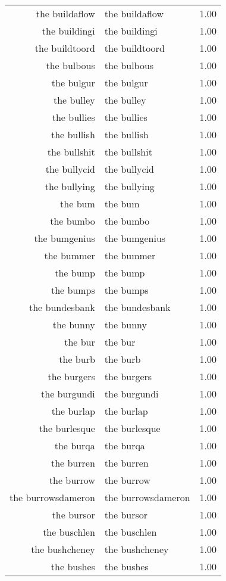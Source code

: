 \begin{table}[ht]
\begin{tabular}{rlr}
  the buildaflow & the buildaflow & 1.00 \\ 
  the buildingi & the buildingi & 1.00 \\ 
  the buildtoord & the buildtoord & 1.00 \\ 
  the bulbous & the bulbous & 1.00 \\ 
  the bulgur & the bulgur & 1.00 \\ 
  the bulley & the bulley & 1.00 \\ 
  the bullies & the bullies & 1.00 \\ 
  the bullish & the bullish & 1.00 \\ 
  the bullshit & the bullshit & 1.00 \\ 
  the bullycid & the bullycid & 1.00 \\ 
  the bullying & the bullying & 1.00 \\ 
  the bum & the bum & 1.00 \\ 
  the bumbo & the bumbo & 1.00 \\ 
  the bumgenius & the bumgenius & 1.00 \\ 
  the bummer & the bummer & 1.00 \\ 
  the bump & the bump & 1.00 \\ 
  the bumps & the bumps & 1.00 \\ 
  the bundesbank & the bundesbank & 1.00 \\ 
  the bunny & the bunny & 1.00 \\ 
  the bur & the bur & 1.00 \\ 
  the burb & the burb & 1.00 \\ 
  the burgers & the burgers & 1.00 \\ 
  the burgundi & the burgundi & 1.00 \\ 
  the burlap & the burlap & 1.00 \\ 
  the burlesque & the burlesque & 1.00 \\ 
  the burqa & the burqa & 1.00 \\ 
  the burren & the burren & 1.00 \\ 
  the burrow & the burrow & 1.00 \\ 
  the burrowsdameron & the burrowsdameron & 1.00 \\ 
  the bursor & the bursor & 1.00 \\ 
  the buschlen & the buschlen & 1.00 \\ 
  the bushcheney & the bushcheney & 1.00 \\ 
  the bushes & the bushes & 1.00 \\ 

\end{tabular}
\end{table}
